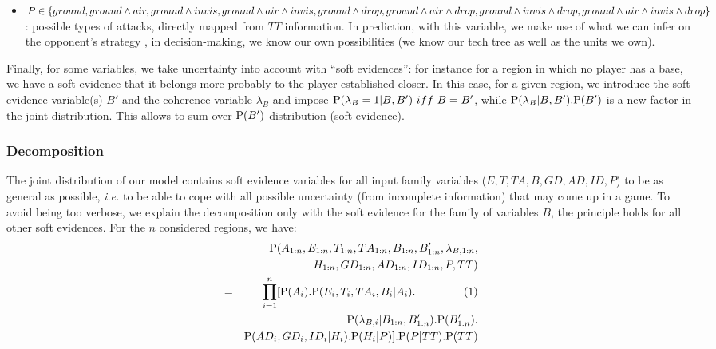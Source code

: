 \begin{itemize}
    \item $P \in \begin{small}\{ground, ground\wedge air, ground\wedge invis, ground\wedge air\wedge invis, ground\wedge drop, ground\wedge air\wedge drop, ground\wedge invis\wedge drop, ground\wedge air\wedge invis\wedge drop\}\end{small}$: possible types of attacks, directly mapped from $TT$ information. In prediction, with this variable, we make use of what we can infer on the opponent's strategy \cite{SYNNAEVE:OpeningPred,SYNNAEVE:StratPred}, in decision-making, we know our own possibilities (we know our tech tree as well as the units we own).
\end{itemize}
Finally, for some variables, we take uncertainty into account with ``soft evidences'': for instance for a region in which no player has a base, we have a soft evidence that it belongs more probably to the player established closer. In this case, for a given region, we introduce the soft evidence variable(s) $B'$ and the coherence variable $\lambda_B$ and impose $\PP(\lambda_B=1|B,B')\ iff\ B=B'$, while $\mathrm{P}(\lambda_B|B,B').\mathrm{P}(B')$ is a new factor in the joint distribution. This allows to sum over $\mathrm{P}(B')$ distribution (soft evidence). 

\subsubsection{Decomposition}
The joint distribution of our model contains soft evidence variables for all input family variables ($E,T,TA,B,GD,AD,ID,P$) to be as general as possible, \textit{i.e.} to be able to cope with all possible uncertainty (from incomplete information) that may come up in a game. To avoid being too verbose, we explain the decomposition only with the soft evidence for the family of variables $B$, the principle holds for all other soft evidences. For the $n$ considered regions, we have:
\begin{eqnarray*}
    & & \PP(A_{1:n}, E_{1:n}, T_{1:n}, TA_{1:n}, B_{1:n}, B'_{1:n}, \lambda_{B,1:n}, \\
& & H_{1:n}, GD_{1:n}, AD_{1:n}, ID_{1:n}, P, TT) \\
    & = & \prod_{i=1}^n [\PP(A_i).\PP(E_i,T_i,TA_i,B_i|A_i).\ \ \ \ \ \ \ \ \ \ \ \ \ \mathrm{(1)}\\
& & \PP(\lambda_{B,i} | B_{1:n},B'_{1:n}).\PP(B'_{1:n}). \\
& & \PP(AD_i,GD_i,ID_i|H_i).\PP(H_i|P)].\PP(P|TT).\PP(TT)
\end{eqnarray*}

